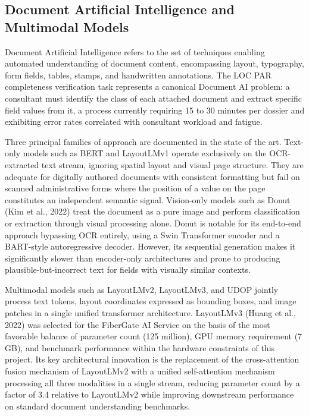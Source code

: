 \subsection{Document Artificial Intelligence and Multimodal Models}

Document Artificial Intelligence refers to the set of techniques enabling automated understanding of document content, encompassing layout, typography, form fields, tables, stamps, and handwritten annotations. The LOC PAR completeness verification task represents a canonical Document AI problem: a consultant must identify the class of each attached document and extract specific field values from it, a process currently requiring 15 to 30 minutes per dossier and exhibiting error rates correlated with consultant workload and fatigue.

Three principal families of approach are documented in the state of the art. Text-only models such as BERT and LayoutLMv1 operate exclusively on the OCR-extracted text stream, ignoring spatial layout and visual page structure. They are adequate for digitally authored documents with consistent formatting but fail on scanned administrative forms where the position of a value on the page constitutes an independent semantic signal. Vision-only models such as Donut (Kim et al., 2022) treat the document as a pure image and perform classification or extraction through visual processing alone. Donut is notable for its end-to-end approach bypassing OCR entirely, using a Swin Transformer encoder and a BART-style autoregressive decoder. However, its sequential generation makes it significantly slower than encoder-only architectures and prone to producing plausible-but-incorrect text for fields with visually similar contexts.

Multimodal models such as LayoutLMv2, LayoutLMv3, and UDOP jointly process text tokens, layout coordinates expressed as bounding boxes, and image patches in a single unified transformer architecture. LayoutLMv3 (Huang et al., 2022) was selected for the FiberGate AI Service on the basis of the most favorable balance of parameter count (125 million), GPU memory requirement (7 GB), and benchmark performance within the hardware constraints of this project. Its key architectural innovation is the replacement of the cross-attention fusion mechanism of LayoutLMv2 with a unified self-attention mechanism processing all three modalities in a single stream, reducing parameter count by a factor of 3.4 relative to LayoutLMv2 while improving downstream performance on standard document understanding benchmarks.

